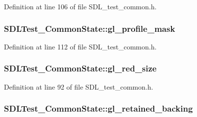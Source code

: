 Definition at line 106 of file S\-D\-L\-\_\-test\-\_\-common.\-h.

\hypertarget{struct_s_d_l_test___common_state_aa923ff5f227c35523a4e491863a7d907}{
\subsubsection[{gl\-\_\-profile\-\_\-mask}]{ S\-D\-L\-Test\-\_\-\-Common\-State\-::gl\-\_\-profile\-\_\-mask}}\label{struct_s_d_l_test___common_state_aa923ff5f227c35523a4e491863a7d907}


Definition at line 112 of file S\-D\-L\-\_\-test\-\_\-common.\-h.

\hypertarget{struct_s_d_l_test___common_state_a33772305944410d726908efb5e0663ce}{
\subsubsection[{gl\-\_\-red\-\_\-size}]{ S\-D\-L\-Test\-\_\-\-Common\-State\-::gl\-\_\-red\-\_\-size}}\label{struct_s_d_l_test___common_state_a33772305944410d726908efb5e0663ce}


Definition at line 92 of file S\-D\-L\-\_\-test\-\_\-common.\-h.

\hypertarget{struct_s_d_l_test___common_state_a5fa59e7aa6210fcde02940536eea9c12}{
\subsubsection[{gl\-\_\-retained\-\_\-backing}]{ S\-D\-L\-Test\-\_\-\-Common\-State\-::gl\-\_\-retained\-\_\-backing}}\label{struct_s_d_l_test___common_state_a5fa59e7aa6210fcde02940536eea9c12}


